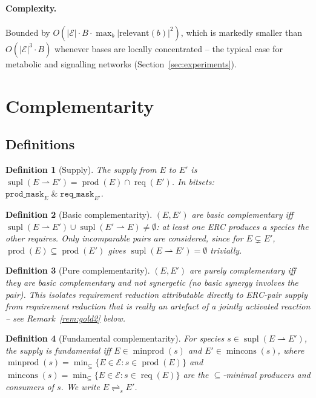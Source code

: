 \documentclass[11pt]{article}
\theoremstyle{plain}
\newtheorem{definition}{Definition}
\theoremstyle{remark}
\newcommand{\prods}{\operatorname{prod}}
\newcommand{\req}{\operatorname{req}}
\newcommand{\supl}{\operatorname{supl}}
\newcommand{\minprod}{\operatorname{minprod}}
\newcommand{\mincons}{\operatorname{mincons}}
\newcommand{\E}{\mathcal{E}}
\newcommand{\fcomp}[1]{\rightleftharpoons_{#1}}
\begin{document}
\paragraph{Complexity.} Bounded by $O(|\E|\cdot B \cdot \max_b|\text{relevant}(b)|^2)$,
which is markedly smaller than $O(|\E|^3\!\cdot\!B)$ whenever bases are
locally concentrated -- the typical case for metabolic and signalling
networks (Section~\ref{sec:experiments}).

\section{Complementarity}\label{sec:stage4}

\subsection{Definitions~\cite{BMBcompanion}}

\begin{definition}[Supply]
The \emph{supply} from $E$ to $E'$ is
$\supl(E \rightharpoonup E') = \prods(E) \cap \req(E')$.
In bitsets: $\mathtt{prod\_mask}_E \;\&\; \mathtt{req\_mask}_{E'}$.
\end{definition}

\begin{definition}[Basic complementarity]
$(E, E')$ are \emph{basic complementary} iff
$\supl(E \rightharpoonup E') \cup \supl(E' \rightharpoonup E) \neq \emptyset$:
at least one ERC produces a species the other requires. Only incomparable
pairs are considered, since for $E\subsetneq E'$, $\prods(E)\subseteq\prods(E')$
gives $\supl(E\rightharpoonup E')=\emptyset$ trivially.
\end{definition}

\begin{definition}[Pure complementarity]
$(E, E')$ are \emph{purely complementary} iff they are basic complementary
and \emph{not} synergetic (no basic synergy involves the pair). This
isolates requirement reduction attributable directly to ERC-pair supply
from requirement reduction that is really an artefact of a jointly
activated reaction -- see Remark~\ref{rem:gold2} below.
\end{definition}

\begin{definition}[Fundamental complementarity]
\label{def:fund_comp}
For species $s \in \supl(E \rightharpoonup E')$, the supply is
\emph{fundamental} iff $E \in \minprod(s)$ and $E' \in \mincons(s)$, where
$\minprod(s)=\min_\subseteq\{E\in\E: s\in\prods(E)\}$ and
$\mincons(s)=\min_\subseteq\{E\in\E: s\in\req(E)\}$ are the
$\subseteq$-minimal producers and consumers of $s$. We write
$E\fcomp{s}E'$.
\end{definition}
\end{document}
